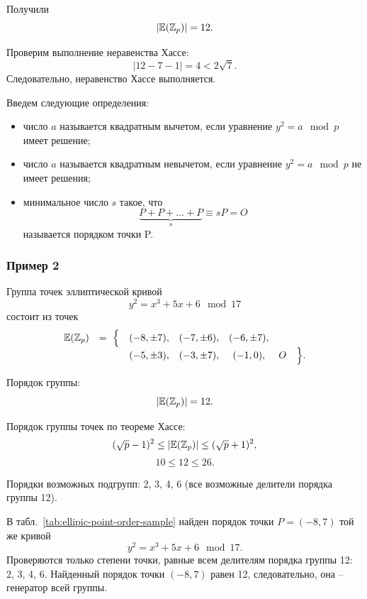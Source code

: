 Получили
    \[ |\mathbb{E}(\mathbb{Z}_p)| = 12. \]

Проверим выполнение неравенства Хассе:
    \[ \left| 12 - 7 - 1 \right| = 4 < 2 \sqrt{7}. \]
Следовательно, неравенство Хассе выполняется.

Введем следующие определения:
\begin{itemize}
    \item число $a$ называется квадратным вычетом, если уравнение $y^{2} =a \mod p$ имеет решение;
    \item число $a$ называется квадратным невычетом, если уравнение $y^{2} =a \mod p$ не имеет решения;
    \item минимальное число $s$ такое, что
        \[ \underbrace{P + P + \ldots + P}_{s} \equiv s P = O \]
        называется порядком точки P.
\end{itemize}



\subsubsection{Пример 2}

Группа точек эллиптической кривой
    \[ y^2 = x^3 + 5 x + 6 \mod 17 \]
состоит из точек
\[ \begin{array}{ccccccc}
    \mathbb{E}(\mathbb{Z}_p) & =~ \Big\{ & (-8, \pm 7), & (-7, \pm 6), & (-6, \pm 7), &   & \\
             &           & (-5, \pm 3), & (-3, \pm 7), & (-1, 0),     & O & \Big\}. \\
\end{array} \]

Порядок группы:
    \[ |\mathbb{E}(\mathbb{Z}_p)| = 12. \]

Порядок группы точек по теореме Хассе:
    \[ (\sqrt{p}-1)^2 \leq |\mathbb{E}(\mathbb{Z}_p)| \leq (\sqrt{p}+1)^2, \]
    \[ 10 \leq 12 \leq 26. \]

Порядки возможных подгрупп: 2, 3, 4, 6 (все возможные делители порядка группы 12).

В табл.~\ref{tab:ellipic-point-order-sample} найден порядок точки $P = (-8, 7)$ той же кривой
    \[ y^2 = x^3 + 5 x + 6 \mod 17. \]
Проверяются только степени точки, равные всем делителям порядка группы 12: 2, 3, 4, 6. Найденный порядок точки $(-8,7)$ равен 12, следовательно, она -- генератор всей группы.

